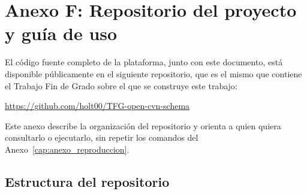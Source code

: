 \chapter*{Anexo F: Repositorio del proyecto y guía de uso}
\label{cap:anexo_repositorio}

El código fuente completo de la plataforma, junto con este documento, está
disponible públicamente en el siguiente repositorio, que es el mismo que
contiene el Trabajo Fin de Grado sobre el que se construye este trabajo:

\begin{center}
\url{https://github.com/holt00/TFG-open-cvn-schema}
\end{center}

Este anexo describe la organización del repositorio y orienta a quien quiera
consultarlo o ejecutarlo, sin repetir los comandos del
Anexo~\ref{cap:anexo_reproduccion}.

\section*{Estructura del repositorio}

